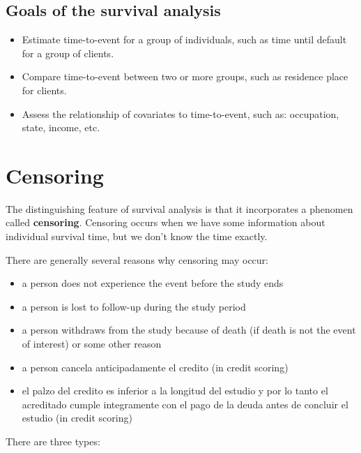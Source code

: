 \documentclass[]{book}
\providecommand{\tightlist}{%
  \setlength{\itemsep}{0pt}\setlength{\parskip}{0pt}}
\theoremstyle{definition}
\theoremstyle{definition}
\theoremstyle{definition}
\theoremstyle{remark}
\begin{document}
\subsection{Goals of the survival
analysis}\label{goals-of-the-survival-analysis}

\begin{itemize}
\item
  Estimate time-to-event for a group of individuals, such as time until
  default for a group of clients.
\item
  Compare time-to-event between two or more groups, such as residence
  place for clients.
\item
  Assess the relationship of covariates to time-to-event, such as:
  occupation, state, income, etc.
\end{itemize}

\section{Censoring}\label{intro-censor}

The distinguishing feature of survival analysis is that it incorporates
a phenomen called \textbf{censoring}. Censoring occurs when we have some
information about individual survival time, but we don't know the time
exactly.

There are generally several reasons why censoring may occur:

\begin{itemize}
\tightlist
\item
  a person does not experience the event before the study ends
\item
  a person is lost to follow-up during the study period
\item
  a person withdraws from the study because of death (if death is not
  the event of interest) or some other reason
\item
  a person cancela anticipadamente el credito (in credit scoring)
\item
  el palzo del credito es inferior a la longitud del estudio y por lo
  tanto el acreditado cumple integramente con el pago de la deuda antes
  de concluir el estudio (in credit scoring)
\end{itemize}

There are three types:
\end{document}
